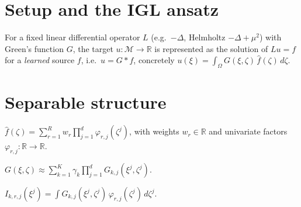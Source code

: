 %
%

\section{Setup and the IGL ansatz}

\begin{definition}\label{def:ansatz}
  For a fixed linear differential operator $L$ (e.g.\ $-\Delta$, Helmholtz $-\Delta+\mu^2$)
  with Green's function $G$, the target $u:\mathcal M\to\mathbb R$ is represented as the
  solution of $Lu=f$ for a \emph{learned} source $f$, i.e.\ $u=G*f$, concretely
  $u(\xi)=\int_\Omega G(\xi,\zeta)\,\hat f(\zeta)\,d\zeta$.
\end{definition}

\section{Separable structure}

\begin{definition}\label{def:separable-source}
  \leanok
  $\displaystyle \hat f(\zeta)=\sum_{r=1}^{R} w_r\prod_{j=1}^{d}\varphi_{r,j}(\zeta^j)$,
  with weights $w_r\in\mathbb R$ and univariate factors $\varphi_{r,j}:\mathbb R\to\mathbb R$.
\end{definition}

\begin{definition}\label{def:separable-kernel}
  \leanok
  $\displaystyle G(\xi,\zeta)\approx\sum_{k=1}^{K}\gamma_k\prod_{j=1}^{d}G_{k,j}(\xi^j,\zeta^j)$.
\end{definition}

\begin{definition}\label{def:partial-integral}
  \leanok
  $\displaystyle I_{k,r,j}(\xi^j)=\int G_{k,j}(\xi^j,\zeta^j)\,\varphi_{r,j}(\zeta^j)\,d\zeta^j$.
\end{definition}


